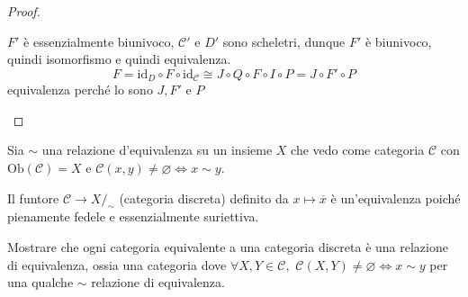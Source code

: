 \begin{proof}
\begin{itemize}
    \(F'\) è essenzialmente biunivoco, \(\mathcal{C}'\) e \(D'\) sono scheletri, dunque \(F'\) è biunivoco, quindi isomorfismo e quindi equivalenza.
    \[
        F = \mathrm{id}_D \circ F \circ \mathrm{id}_{\mathcal{C}}
        \cong J \circ Q \circ F \circ I \circ P
        = J \circ F' \circ P
    \]
    equivalenza perché lo sono \(J, F'\) e \(P\) 
\end{itemize}
\end{proof}

\begin{example}{}
    Sia \(\sim \) una relazione d'equivalenza su un insieme \(X\) che vedo come
    categoria \(\mathcal{C}\) con \(\mathrm{Ob}{(\mathcal{C})} = X\)  e \(\mathcal{C}{(x,y)} \neq \varnothing \iff x \sim y\).

    Il funtore \(\mathcal{C} \to X/_\sim\) (categoria discreta) definito da \(x \mapsto
    \overline{x}\) è un'equivalenza poiché pienamente fedele e essenzialmente
    suriettiva.
\end{example}

\begin{eser}{}
    Mostrare che ogni categoria equivalente a una categoria discreta è una relazione di
    equivalenza, ossia una categoria dove \(\forall X, Y \in \mathcal{C}, \,\,
    \mathcal{C}{(X,Y)} \neq \varnothing \iff x \sim y \) per una qualche \(\sim \) relazione di
    equivalenza.
\end{eser}

